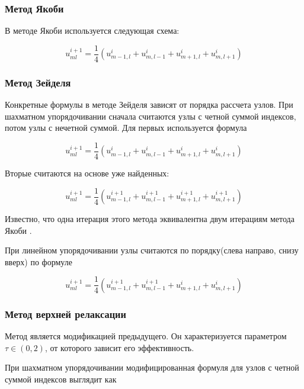 \documentclass[report , a4paper, onecolumn, 12pt]{article}
\begin{document}
\subsubsection{Метод Якоби}

В методе Якоби используется следующая схема:

\begin{equation}
 u^{i + 1}_{ml} = \frac{1}{4} (u^{i}_{m-1, l} + u^{i}_{m, l-1} + u^{i}_{m + 1, l} + u^i_{m, l + 1}) 
\end{equation}

\subsubsection{Метод Зейделя}

Конкретные формулы в методе Зейделя зависят от порядка рассчета узлов. При шахматном упорядочивании сначала считаются узлы с четной суммой индексов, потом узлы с нечетной суммой. Для первых используется формула

\begin{equation}
 u^{i + 1}_{ml} = \frac{1}{4} (u^{i}_{m-1, l} + u^{i}_{m, l-1} + u^{i}_{m + 1, l} + u^i_{m, l + 1}) 
\end{equation}

Вторые считаются на основе уже найденных:

\begin{equation}
 u^{i + 1}_{ml} = \frac{1}{4} (u^{i+1}_{m-1, l} + u^{i+1}_{m, l-1} + u^{i+1}_{m + 1, l} + u^{i+1}_{m, l + 1}) 
\end{equation}

Известно, что одна итерация этого метода эквивалентна двум итерациям метода Якоби \cite{aristova}.

При линейном упорядочивании узлы считаются по порядку(слева направо, снизу вверх) по формуле

\begin{equation}
 u^{i+1}_{ml} =  \frac{1}{4} (u^{i+1}_{m-1, l} + u^{i+1}_{m, l-1} + u^{i}_{m + 1, l} + u^{i}_{m, l + 1}) 
\end{equation}


\subsubsection{Метод верхней релаксации}

Метод является модификацией предыдущего. Он характеризуется параметром $\tau\in (0,2)$, от которого зависит его эффективность. 

При шахматном упорядочивании модифицированная формуля для узлов с четной суммой индексов выглядит как
\end{document}
